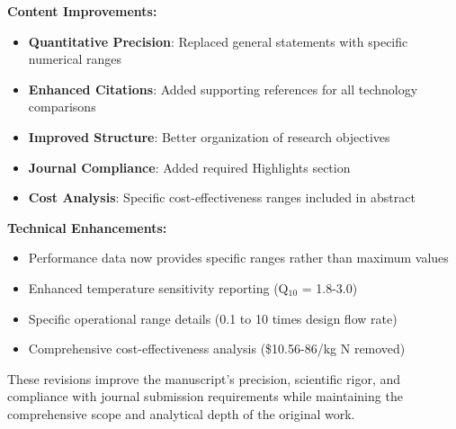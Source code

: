 \documentclass[12pt,a4paper]{article}
\begin{document}
\textbf{Content Improvements:}
\begin{itemize}
\item \textbf{Quantitative Precision}: Replaced general statements with specific numerical ranges
\item \textbf{Enhanced Citations}: Added supporting references for all technology comparisons
\item \textbf{Improved Structure}: Better organization of research objectives
\item \textbf{Journal Compliance}: Added required Highlights section
\item \textbf{Cost Analysis}: Specific cost-effectiveness ranges included in abstract
\end{itemize}

\textbf{Technical Enhancements:}
\begin{itemize}
\item Performance data now provides specific ranges rather than maximum values
\item Enhanced temperature sensitivity reporting (Q$_{10}$ = 1.8-3.0)
\item Specific operational range details (0.1 to 10 times design flow rate)
\item Comprehensive cost-effectiveness analysis (\$10.56-86/kg N removed)
\end{itemize}

These revisions improve the manuscript's precision, scientific rigor, and compliance with journal submission requirements while maintaining the comprehensive scope and analytical depth of the original work.
\end{document}
